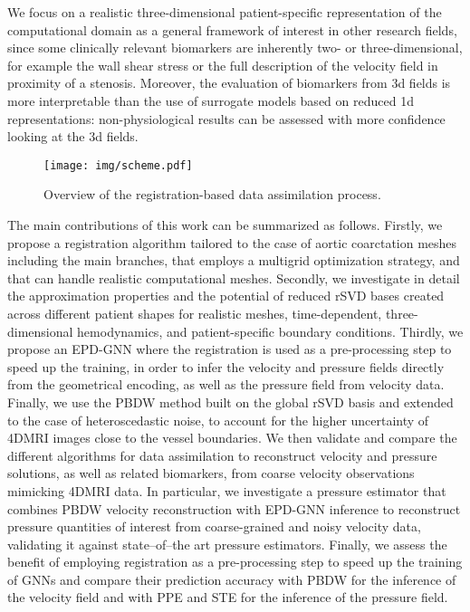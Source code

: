 We focus on a realistic three-dimensional patient-specific representation of the computational domain as a general framework of interest in other research fields,
since some clinically relevant biomarkers are inherently two- or three-dimensional, for example the wall shear stress or the full description of the velocity field in proximity of a stenosis. Moreover, the evaluation of biomarkers from 3d fields is more interpretable than the use of surrogate models based on reduced 1d representations: non-physiological results can be assessed with more confidence looking at the 3d fields.

\begin{figure}[!htp]
  \centering
  \texttt{[image: img/scheme.pdf]}
  \caption{Overview of the registration-based data assimilation process.}
  \label{fig:scheme}
\end{figure}

The main contributions of this work can be summarized as follows. 
%
Firstly, we propose a registration algorithm tailored to the case of aortic coarctation meshes including the main branches, that employs a multigrid optimization strategy, and that can handle realistic computational meshes.
%
Secondly, we investigate in detail the approximation properties and the potential of reduced rSVD bases created across different patient shapes for realistic meshes, time-dependent, three-dimensional hemodynamics, and patient-specific boundary conditions. 
%
Thirdly, we propose an EPD-GNN where the registration is used as a pre-processing step to speed up the training, in order to infer the velocity and pressure fields directly from the geometrical encoding, as well as the pressure field from velocity data.
%
Finally, we use the PBDW method built on the global rSVD basis and extended to the case of heteroscedastic noise, to account for 
the higher uncertainty of 4DMRI images close to the vessel boundaries.
%
We then validate and compare the different algorithms for data assimilation to reconstruct velocity and pressure solutions, as well as related biomarkers, from coarse velocity observations 
mimicking 4DMRI data. In particular, we investigate a pressure estimator that combines PBDW velocity reconstruction with EPD-GNN inference to reconstruct pressure quantities of interest
from coarse-grained and noisy velocity data, validating it against state--of--the art pressure estimators.
Finally, we assess the benefit of employing registration as a pre-processing step to speed up the training of GNNs and compare their prediction accuracy with PBDW for the inference of the velocity field and with PPE and STE for the inference of the pressure field.


